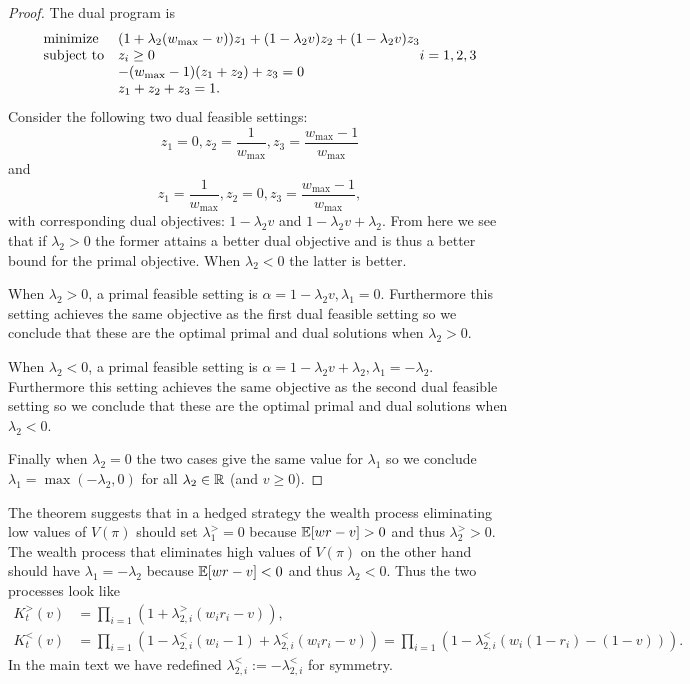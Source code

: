 \begin{proof}
The dual program is
\begin{equation*}
\begin{array}{ll@{}ll}
\text{minimize}  & (1+\lambda_2(w_{\max}-v))z_1 +(1-\lambda_2 v) z_2 + (1-\lambda_2 v) z_3 &\\
\text{subject to}& z_i \geq 0  & i=1,2,3 \\
                 & -(w_{\max}-1)(z_1+z_2)+z_3 = 0 \\
                 & z_1+z_2+z_3=1. \\
\end{array}
\end{equation*}
Consider the following two dual feasible settings:
\[
z_1=0,z_2=\frac{1}{w_{\max}}, z_3=\frac{w_{\max}-1}{w_{\max}}
\]
and 
\[
z_1=\frac{1}{w_{\max}}, z_2=0, z_3=\frac{w_{\max}-1}{w_{\max}},
\]
with corresponding dual objectives: $1-\lambda_2 v$ and $1-\lambda_2 v + \lambda_2$. From here we see that if $\lambda_2 > 0$ the former attains a
better dual objective and is thus a better bound
for the primal objective. When $\lambda_2<0$ the latter
is better. 

When $\lambda_2>0$, a primal feasible setting is
$\alpha=1-\lambda_2 v,\lambda_1=0$. Furthermore this setting
achieves the same objective as the first dual feasible setting so 
we conclude that these are the optimal primal and dual solutions when $\lambda_2>0$.

When $\lambda_2<0$, a primal feasible setting is 
$\alpha=1-\lambda_2 v +\lambda_2, \lambda_1=-\lambda_2$. Furthermore this setting
achieves the same objective as the second dual feasible setting
so we conclude that these are the optimal primal and dual solutions when $\lambda_2<0$. 

Finally when $\lambda_2=0$ the two cases give the same value for $\lambda_1$ so we conclude $\lambda_1=\max(-\lambda_2,0)$ for all $\lambda_2 \in \mathbb{R}$ (and $v\geq 0$).
\end{proof}

The theorem suggests that in a hedged strategy the wealth process
eliminating low values of $V(\pi)$ should set 
$\lambda_1^{>} = 0$ because $\mathbb{E}[wr-v] >0$ and thus $\lambda_2^{>} >0$.
The wealth process that eliminates high values of $V(\pi)$
on the other hand should have 
$\lambda_1 = -\lambda_2$ because $\mathbb{E}[wr-v] <0$ and thus $\lambda_2<0$.
Thus the two processes look like
\begin{align*}
K_t^{>}(v)&=\prod_{i=1} \left(1+\lambda_{2,i}^{>} (w_i r_i -v)\right),\\
K_t^{<}(v)&=\prod_{i=1} \left(1-\lambda_{2,i}^{<} (w_i - 1) + \lambda_{2,i}^{<} \left(w_i r_i -v\right)\right)=\prod_{i=1} \left(1-\lambda_{2,i}^{<} \left(w_i (1-r_i) -  (1-v)\right)\right).
\end{align*}
In the main text we have redefined $\lambda_{2,i}^{<}:=-\lambda_{2,i}^{<}$
for symmetry.

